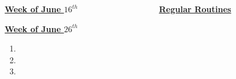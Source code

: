 \documentclass[serif, mathserif, final]{beamer}
\begin{document}
\begin{frame}{}
\begin{columns}
\begin{column}{0.5\linewidth}
\begin{block}{\small \underline{\textbf{Week of June $16^{th}$}}}
\begin{enumerate}
\end{enumerate}
\end{block}

\begin{block}{\small \underline{\textbf{Week of June $26^{th}$}}}
\begin{enumerate}
\tiny \item \tiny 
\item \tiny 
\item \tiny 
\end{enumerate}
\end{block}

\end{column}


\begin{column}{0.28\linewidth}
\begin{block}{\small \textbf{\underline{Regular Routines}} }

\end{block} 
\end{column}%
\end{columns} 
\end{frame}
\end{document}
